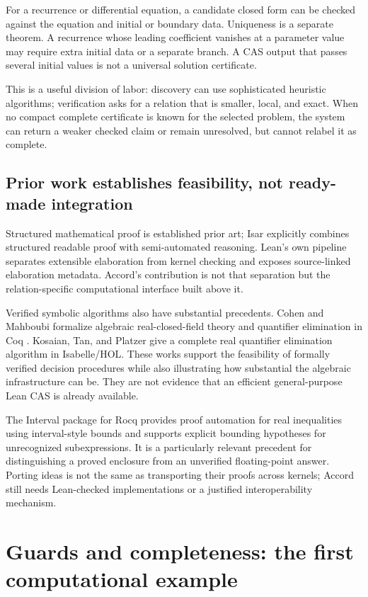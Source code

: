 \documentclass[11pt,letterpaper]{article}
\theoremstyle{definition}
\begin{document}
For a recurrence or differential equation, a candidate closed form can be checked
against the equation and initial or boundary data. Uniqueness is a separate theorem.
A recurrence whose leading coefficient vanishes at a parameter value may require
extra initial data or a separate branch. A CAS output that passes several initial
values is not a universal solution certificate.

This is a useful division of labor: discovery can use sophisticated heuristic
algorithms; verification asks for a relation that is smaller, local, and exact.
When no compact complete certificate is known for the selected problem, the
system can return a weaker checked claim or remain unresolved, but cannot relabel
it as complete.

\subsection{Prior work establishes feasibility, not ready-made integration}
Structured mathematical proof is established prior art; Isar explicitly combines
structured readable proof with semi-automated reasoning\cite{isar}. Lean's own
pipeline separates extensible elaboration from kernel checking and exposes
source-linked elaboration metadata\cite{leanelab}. Accord's contribution is not
that separation but the relation-specific computational interface built above it.

Verified symbolic algorithms also have substantial precedents. Cohen and Mahboubi
formalize algebraic real-closed-field theory and quantifier elimination in Coq
\cite{cohenmahboubi}. Kosaian, Tan, and Platzer give a complete real quantifier
elimination algorithm in Isabelle/HOL\cite{kosaian}. These works support the
feasibility of formally verified decision procedures while also illustrating how
substantial the algebraic infrastructure can be. They are not evidence that an
efficient general-purpose Lean CAS is already available.

The Interval package for Rocq provides proof automation for real inequalities
using interval-style bounds and supports explicit bounding hypotheses for
unrecognized subexpressions\cite{interval}. It is a particularly relevant
precedent for distinguishing a proved enclosure from an unverified floating-point
answer. Porting ideas is not the same as transporting their proofs across kernels;
Accord still needs Lean-checked implementations or a justified interoperability
mechanism.

\section{Guards and completeness: the first computational example}\label{sec:linear}
\end{document}
